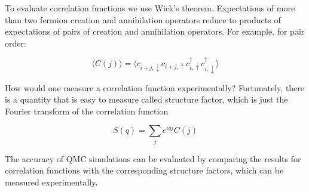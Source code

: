 \documentclass[10pt, twocolumn, twoside]{article}
\begin{document}
To evaluate correlation functions we use Wick's theorem. Expectations of more than two fermion creation and annihilation operators reduce to products of expectations of pairs of creation and annihilation operators. For example, for pair order:

\begin{equation}
\big\langle C(j) \big\rangle = \big\langle c_{i+j, \downarrow} c_{i+j, \uparrow} c_{i, \uparrow}^\dagger c_{i, \downarrow}^\dagger \big\rangle
\end{equation}

How would one measure a correlation function experimentally? Fortunately, there is a quantity that is easy to measure called structure factor, which is just the Fourier transform of the correlation function

\begin{equation}
S(q) = \sum_j e^{iqj} C(j) 
\end{equation}

The accuracy of QMC simulations can be evaluated by comparing the results for correlation functions with the corresponding structure factors, which can be measured experimentally.

\printbibliography
\end{document}
